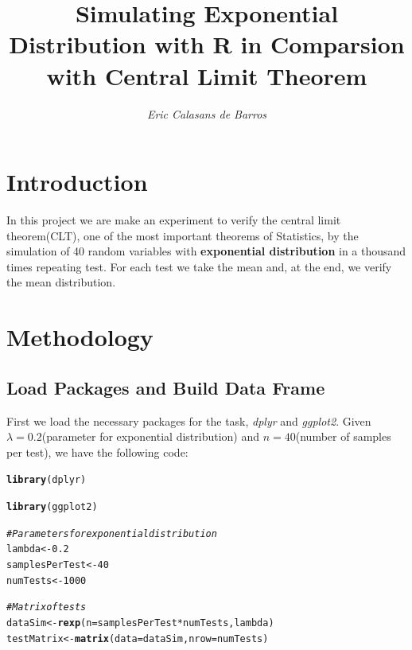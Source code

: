 \documentclass[a4paper, 12pt]{article}\usepackage[]{graphicx}\usepackage[]{color}
\title{\textbf{Simulating Exponential Distribution with R in Comparsion with Central Limit Theorem}}
\author{\textit{Eric Calasans de Barros}}
\makeatletter
\newcommand{\hlnum}[1]{\textcolor[rgb]{0.686,0.059,0.569}{#1}}%
\newcommand{\hlcom}[1]{\textcolor[rgb]{0.678,0.584,0.686}{\textit{#1}}}%
\newcommand{\hlopt}[1]{\textcolor[rgb]{0,0,0}{#1}}%
\newcommand{\hlstd}[1]{\textcolor[rgb]{0.345,0.345,0.345}{#1}}%
\newcommand{\hlkwb}[1]{\textcolor[rgb]{0.69,0.353,0.396}{#1}}%
\newcommand{\hlkwc}[1]{\textcolor[rgb]{0.333,0.667,0.333}{#1}}%
\newcommand{\hlkwd}[1]{\textcolor[rgb]{0.737,0.353,0.396}{\textbf{#1}}}%
\newenvironment{kframe}{%
 \def\at@end@of@kframe{}%
 \ifinner\ifhmode%
  \def\at@end@of@kframe{\end{minipage}}%
  \begin{minipage}{\columnwidth}%
 \fi\fi%
 \def\FrameCommand##1{\hskip\@totalleftmargin \hskip-\fboxsep
 \colorbox{shadecolor}{##1}\hskip-\fboxsep
     \hskip-\linewidth \hskip-\@totalleftmargin \hskip\columnwidth}%
 \MakeFramed {\advance\hsize-\width
   \@totalleftmargin\z@ \linewidth\hsize
   \@setminipage}}%
 {\par\unskip\endMakeFramed%
 \at@end@of@kframe}
\newenvironment{knitrout}{}{} %
\makeatother
\begin{document}
	\maketitle
	
	\section{Introduction}
	In this project we are make an experiment to verify the central limit theorem(CLT), one of the most important theorems of Statistics, by the simulation of 40 random variables with \textbf{exponential distribution} in a thousand times repeating test.  For each test we take the mean and, at the end, we verify the mean distribution.
	
	\section{Methodology}
		\subsection{Load Packages and Build Data Frame}
		First we load the necessary packages for the task, \textit{dplyr} and \textit{ggplot2}.  Given $\lambda = 0.2$(parameter for exponential distribution) and $n = 40$(number of samples per test), we have the following code:
\begin{knitrout}\small
{}\color{fgcolor}\begin{kframe}
\begin{alltt}
\hlkwd{library}\hlstd{(dplyr)}
\end{alltt}


{\ttfamily\noindent\color{warningcolor}{\#\# Warning: package 'dplyr' was built under R version 3.4.2}}\begin{alltt}
\hlkwd{library}\hlstd{(ggplot2)}

\hlcom{#Parameters for exponential distribution}
\hlstd{lambda} \hlkwb{<-} \hlnum{0.2}
\hlstd{samplesPerTest} \hlkwb{<-} \hlnum{40}
\hlstd{numTests} \hlkwb{<-} \hlnum{1000}

\hlcom{#Matrix of tests}
\hlstd{dataSim} \hlkwb{<-} \hlkwd{rexp}\hlstd{(}\hlkwc{n} \hlstd{= samplesPerTest}\hlopt{*}\hlstd{numTests,lambda)}
\hlstd{testMatrix} \hlkwb{<-} \hlkwd{matrix}\hlstd{(}\hlkwc{data} \hlstd{= dataSim,} \hlkwc{nrow} \hlstd{= numTests)}
\end{alltt}
\end{kframe}
\end{knitrout}
\end{document}
